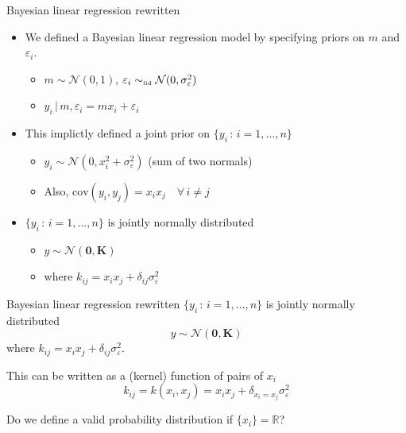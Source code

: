 \begin{frame}{Bayesian linear regression rewritten}
  \begin{itemize}
    \item We defined a Bayesian linear regression model by specifying priors on $m$ and $\varepsilon_i$.
    \pause
    \begin{itemize}
      \item $m \sim \mathcal{N}(0, 1)$, $\varepsilon_i \sim_{\mbox{\tiny iid}} \mathcal{N}(0, \sigma_\varepsilon^2)$
      \pause
      \item $y_i \,|\, m, \varepsilon_i = mx_i + \varepsilon_i$
    \end{itemize}
    \vspace{\baselineskip}
    \pause
    \item This implictly defined a joint prior on $\{y_i \,:\, i=1,\ldots,n\}$
    \pause
    \begin{itemize}
      \item $y_i \sim \mathcal{N}(0, x_i^2 + \sigma_\varepsilon^2)$ (sum of two normals)
      \pause
      \item Also, $\textrm{cov}(y_i, y_j) = x_i x_j \quad \forall\,i\neq j$
    \end{itemize}
    \vspace{\baselineskip}
    \pause
    \item \ie $\{y_i \,:\, i=1,\ldots,n\}$ is jointly normally distributed
    \begin{itemize}
      \item $y \sim \mathcal{N}(\mathbf{0}, \mathbf{K})$
      \item where $k_{ij} = x_i x_j + \delta_{ij} \sigma_\varepsilon^2$
    \end{itemize}
  \end{itemize}
\end{frame}

\begin{frame}{Bayesian linear regression rewritten}
  $\{y_i \,:\, i=1,\ldots,n\}$ is jointly normally distributed
  \begin{equation*}
    y \sim \mathcal{N}(\mathbf{0}, \mathbf{K})
  \end{equation*}
  where $k_{ij} = x_i x_j + \delta_{ij} \sigma_\varepsilon^2$.
  
  \vspace{\baselineskip}
  \pause
  
  This can be written as a (kernel) function of pairs of $x_i$
  \begin{equation*}
    k_{ij} = k(x_i, x_j) = x_i x_j + \delta_{x_i = x_j}\sigma_\varepsilon^2
  \end{equation*}
  
  \vspace{\baselineskip}
  \pause
  
  Do we define a valid probability distribution if $\{x_i\} = \mathbb{R}$?
\end{frame}

